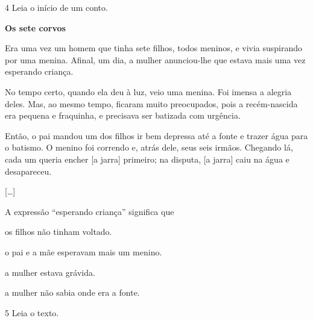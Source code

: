 \num{4} Leia o início de um conto.

\begin{myquote}
\textbf{Os sete corvos}

Era uma vez um homem que tinha sete filhos, todos meninos, e vivia
suspirando por uma menina. Afinal, um dia, a mulher anunciou-lhe que
estava mais uma vez esperando criança.

No tempo certo, quando ela deu à luz, veio uma menina. Foi imensa a
alegria deles. Mas, ao mesmo tempo, ficaram muito preocupados, pois a
recém-nascida era pequena e fraquinha, e precisava ser batizada com
urgência.

Então, o pai mandou um dos filhos ir bem depressa até a fonte e trazer
água para o batismo. O menino foi correndo e, atrás dele, seus seis
irmãos. Chegando lá, cada um queria encher [a jarra] primeiro; na
disputa, [a jarra] caiu na água e desapareceu.

{[}\ldots{}{]}

\end{myquote}

A expressão ``esperando criança'' significa que

\begin{escolha}
\item os filhos não tinham voltado.

\item o pai e a mãe esperavam mais um menino.

\item a mulher estava grávida.

\item a mulher não sabia onde era a fonte.
\end{escolha}

\num{5} Leia o texto.

